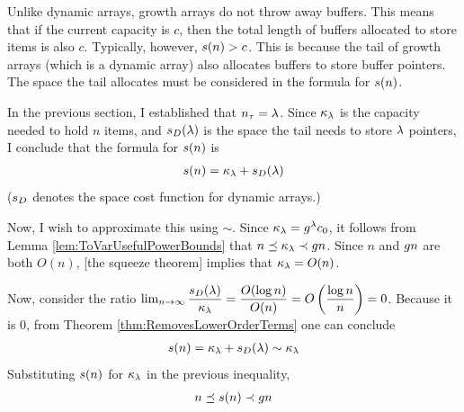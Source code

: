 \HdrSpaceComplex

Unlike dynamic arrays, growth arrays do not throw away buffers. This means that if the current capacity is $c$, then the total length of buffers allocated to store items is also $c$. Typically, however, $s(n) > c$. This is because the tail of growth arrays (which is a dynamic array) also allocates buffers to store buffer pointers. The space the tail allocates must be considered in the formula for $s(n)$.

In the previous section, I established that $n_\tau = \lambda$. Since $\kappa_\lambda$ is the capacity needed to hold $n$ items, and $s_D(\lambda)$ is the space the tail needs to store $\lambda$ pointers, I conclude that the formula for $s(n)$ is
\begin{align*}
s(n) = \kappa_\lambda + s_D(\lambda)
\end{align*}
($s_D$ denotes the space cost function for dynamic arrays.)


Now, I wish to approximate this using $\sim$. Since $\kappa_\lambda = g^\lambda c_0$, it follows from Lemma \ref{lem:ToVarUsefulPowerBounds} that $n \preceq \kappa_\lambda \prec g{n}$. Since $n$ and $g{n}$ are both $O(n)$, [the squeeze theorem] implies that $\kappa_\lambda = O(n)$.

Now, consider the ratio $\lim_{n \to \infty} \dfrac {s_D(\lambda)} {\kappa_\lambda} = \dfrac {O(\log n)} {O(n)} = O \left( \dfrac{\log n}{n} \right) = 0$. Because it is $0$, from Theorem \ref{thm:RemovesLowerOrderTerms} one can conclude
\begin{align*}
s(n) = \kappa_\lambda + s_D(\lambda) \sim \kappa_\lambda
\end{align*}
Substituting $s(n)$ for $\kappa_\lambda$ in the previous inequality,
\begin{align*}
n \preceq s(n) \prec g{n}
\end{align*}